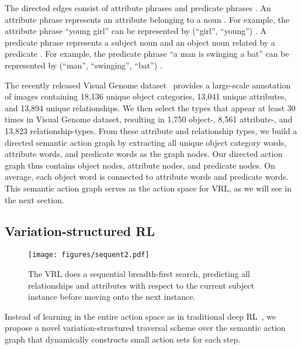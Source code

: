 \documentclass[10pt,twocolumn,letterpaper]{article}
\begin{document}
The directed edges  consist of attribute phrases { and predicate phrases }. An attribute phrase  represents an attribute  belonging to a noun . For example, the attribute phrase ``young girl'' can be represented by (``girl'', ``young'') . A predicate phrase  represents a subject noun  and an object noun  related by a predicate . For example, the predicate phrase ``a man is swinging a bat'' can be represented by (``man'', ``swinging'', ``bat'') .

The recently released Visual Genome dataset~\cite{krishna2016visual} provides a large-scale annotation of images containing 18,136 unique object categories, 13,041 unique attributes, and 13,894 unique relationships. We then select the types that appear at least 30 times in Visual Genome dataset, resulting in 1,750 object-, 8,561 attribute-, and 13,823 relationship-types. From these attribute and relationship types, we build a directed semantic action graph by extracting all unique object category words, attribute words, and predicate words as the graph nodes. Our directed action graph thus contains  object nodes,  attribute nodes, and  predicate nodes. On average, each object word is connected to  attribute words and  predicate words. This semantic action graph serves as the action space for VRL, as we will see in the next section.\\

\vspace{-2mm}
\subsection{Variation-structured RL}

 \begin{figure}[!tp]
 	\begin{center}
 		\texttt{[image: figures/sequent2.pdf]}
 		\caption{{{The VRL does a sequential breadth-first search, predicting all relationships and attributes with respect to the current subject instance before moving onto the next instance.} }} 
 		\label{fig:search}
 	\end{center}
 	\vspace{-7mm}
 \end{figure}
 
Instead of learning in the entire action space as in traditional deep RL~\cite{mnih2015human,zhu2016target}, we propose a novel variation-structured traversal scheme over the semantic action graph that dynamically constructs small action sets for each step.
\end{document}
